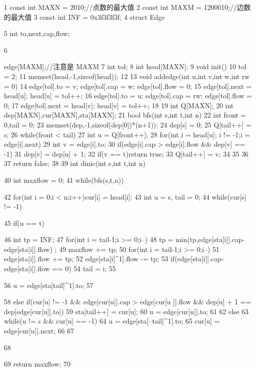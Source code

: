 \documentclass[11pt]{article}
\begin{document}
\begin{Code}
1    const int MAXN = 2010;//点数的最大值
2    const int MAXM = 1200010;//边数的最大值
3    const int INF = 0x3f3f3f3f;
4    struct Edge{
5        int to,next,cap,flow;


 6   }edge[MAXM];//注意是 MAXM
 7   int tol;
 8   int head[MAXN];
 9   void init(){
10       tol = 2;
11       memset(head,-1,sizeof(head));
12   }
13   void addedge(int u,int v,int w,int rw = 0){
14       edge[tol].to = v; edge[tol].cap = w; edge[tol].flow = 0;
15       edge[tol].next = head[u]; head[u] = tol++;
16       edge[tol].to = u; edge[tol].cap = rw; edge[tol].flow = 0;
17       edge[tol].next = head[v]; head[v] = tol++;
18   }
19   int Q[MAXN];
20   int dep[MAXN],cur[MAXN],sta[MAXN];
21   bool bfs(int s,int t,int n){
22       int front = 0,tail = 0;
23       memset(dep,-1,sizeof(dep[0])*(n+1));
24       dep[s] = 0;
25       Q[tail++] = s;
26       while(front < tail){
27           int u = Q[front++];
28           for(int i = head[u]; i != -1;i = edge[i].next){
29                int v = edge[i].to;
30                if(edge[i].cap > edge[i].flow && dep[v] == -1){
31                    dep[v] = dep[u] + 1;
32                    if(v == t)return true;
33                    Q[tail++] = v;
34                }
35           }
36       }
37       return false;
38   }
39   int dinic(int s,int t,int n){
40       int maxflow = 0;
41       while(bfs(s,t,n)){
42           for(int i = 0;i < n;i++)cur[i] = head[i];
43           int u = s, tail = 0;
44           while(cur[s] != -1){
45                if(u == t){
46                    int tp = INF;
47                    for(int i = tail-1;i >= 0;i--)
48                        tp = min(tp,edge[sta[i]].cap-edge[sta[i]].flow)
                             ;
49                    maxflow += tp;
50                    for(int i = tail-1;i >= 0;i--){
51                        edge[sta[i]].flow += tp;
52                        edge[sta[i]^1].flow -= tp;
53                        if(edge[sta[i]].cap-edge[sta[i]].flow == 0)
54                             tail = i;
55                    }


56                      u = edge[sta[tail]^1].to;
57                  }
58                  else if(cur[u] != -1 && edge[cur[u]].cap > edge[cur[u
                       ]].flow && dep[u] + 1 == dep[edge[cur[u]].to]){
59                      sta[tail++] = cur[u];
60                      u = edge[cur[u]].to;
61                  }
62                  else {
63                      while(u != s && cur[u] == -1)
64                          u = edge[sta[--tail]^1].to;
65                      cur[u] = edge[cur[u]].next;
66                  }
67              }
68       }
69       return maxflow;
70 }
\end{Code}
\end{document}

